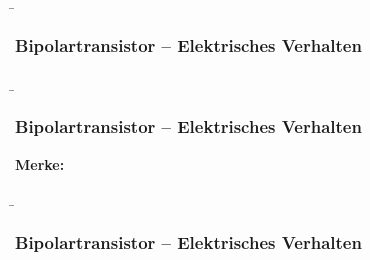 \begin{frame}
    \b{ \frametitle{Bipolartransistor -- Elektrisches Verhalten}
        \begin{figure}[H]
            \centering
            
        \end{figure}
        }
\end{frame}

\begin{frame}
    \b{\frametitle{Bipolartransistor -- Elektrisches Verhalten}
        \textbf{Merke:}
        \begin{itemize}
        \end{itemize}
        }
\end{frame}

\begin{frame}
    \b{ \frametitle{Bipolartransistor -- Elektrisches Verhalten}    
        \begin{figure}[H]
        \end{figure}
    }
\end{frame}

